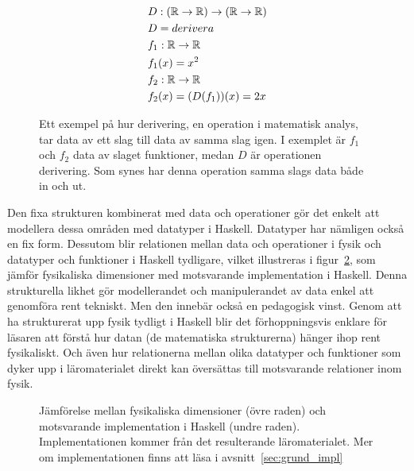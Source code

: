 \begin{figure}[tph]
\begin{mdframed}
  \vspace{-0.5cm}
\begin{align*}
  &D : (\mathbb{R} \rightarrow \mathbb{R}) \rightarrow (\mathbb{R} \rightarrow \mathbb{R}) \\
  &D = derivera \\
  &f_1 : \mathbb{R} \rightarrow \mathbb{R} \\
  &f_1(x) = x^2 \\
  &f_2 : \mathbb{R} \rightarrow \mathbb{R} \\
  &f_2(x) = (D(f_1))(x) = 2x
\end{align*}
\end{mdframed}
\caption{Ett exempel på hur derivering, en operation i matematisk analys, tar
data av ett slag till data av samma slag igen. I exemplet är $f_1$ och $f_2$
data av slaget funktioner, medan $D$ är operationen derivering. Som synes har
denna operation samma slags data både in och ut.}\label{fig:analys_op_exempel}
\end{figure}

Den fixa strukturen kombinerat med data och operationer gör det enkelt att
modellera dessa områden med datatyper i Haskell. Datatyper har nämligen också en
fix form. Dessutom blir relationen mellan data och operationer i fysik och
datatyper och funktioner i Haskell tydligare, vilket illustreras i
figur~\ref{fig:haskell_fysik_likhet}, som jämför fysikaliska dimensioner med
motsvarande implementation i Haskell. Denna strukturella likhet gör
modellerandet och manipulerandet av data enkel att genomföra rent tekniskt. Men
den innebär också en pedagogisk vinst. Genom att ha strukturerat upp fysik
tydligt i Haskell blir det förhoppningsvis enklare för läsaren att förstå hur
datan (de matematiska strukturerna) hänger ihop rent fysikaliskt. Och även hur relationerna mellan olika
datatyper och funktioner som dyker upp i läromaterialet direkt kan översättas
till motsvarande relationer inom fysik.

\begin{figure}[tph]
  \centering
  \caption{Jämförelse mellan fysikaliska dimensioner (övre raden) och
  motsvarande implementation i Haskell (undre raden). Implementationen kommer
från det resulterande läromaterialet. Mer om implementationen finns att läsa i
avsnitt~\ref{sec:grund_impl}}\label{fig:haskell_fysik_likhet}
\end{figure}

